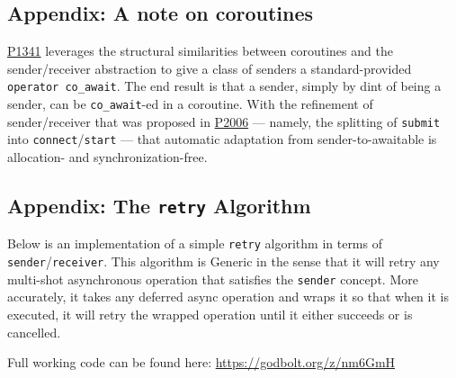 \documentclass[a4paper,12pt,notitlepage,twoside,openright]{article}
\begin{document}
\hypertarget{appendix-a-note-on-coroutines}{%
\subsection{Appendix: A note on
coroutines}\label{appendix-a-note-on-coroutines}}

\href{http://wg21.link/P1341}{P1341} leverages the structural
similarities between coroutines and the sender/receiver abstraction to
give a class of senders a standard-provided
\texttt{operator co_await}. The end result is that a sender,
simply by dint of being a sender, can be
\texttt{co_await}-ed in a coroutine. With the refinement of
sender/receiver that was proposed in
\href{https://wg21.link/P2006}{P2006} --- namely, the splitting of
\texttt{submit} into
\texttt{connect}/\texttt{start} --- that
automatic adaptation from sender-to-awaitable is allocation- and
synchronization-free.

\hypertarget{appendix-the-retry-algorithm}{%
\subsection{\texorpdfstring{Appendix: The \texttt{retry}
Algorithm}{Appendix: The  Algorithm}}\label{appendix-the-retry-algorithm}}

Below is an implementation of a simple \texttt{retry}
algorithm in terms of
\texttt{sender}/\texttt{receiver}. This
algorithm is Generic in the sense that it will retry any multi-shot
asynchronous operation that satisfies the \texttt{sender}
concept. More accurately, it takes any deferred async operation and
wraps it so that when it is executed, it will retry the wrapped
operation until it either succeeds or is cancelled.

Full working code can be found here: \url{https://godbolt.org/z/nm6GmH}
\end{document}
